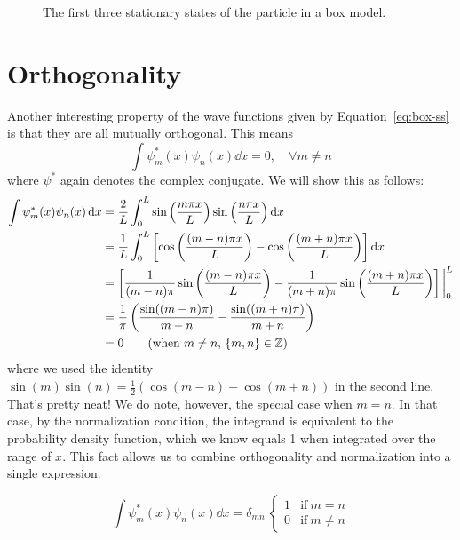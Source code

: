 \begin{figure}[!h]
	\centering
	\subfloat[]{\texttt{[image: ss-1]}}
	\subfloat[]{\texttt{[image: ss-2]}}
	\subfloat[]{\texttt{[image: ss-3]}}
	\caption{The first three stationary states of the particle in a box model.}
	\label{fig:ss-box}
\end{figure}


\section{Orthogonality}
Another interesting property of the wave functions given by Equation~\ref{eq:box-ss} is that they are all mutually orthogonal. This means 
\begin{equation*}
	\int \psi_m^*(x) \psi_n(x) \dd{x} = 0, \quad \forall m \neq n
\end{equation*}
where $\psi^*$ again denotes the complex conjugate. We will show this as follows:
\begin{align*}
	\int \psi_m^*(x) \psi_n(x) \dd{x} &= \frac{2}{L} \int_0^L \sin\left(\frac{m\pi x}{L}\right) \sin\left(\frac{n\pi x}{L} \right) \dd{x} \\
	&= \frac{1}{L} \int_{0}^{L} \left[ \cos\left(\frac{(m-n)\pi x}{L}\right) - \cos\left(\frac{(m+n)\pi x}{L}\right) \right] \dd{x} \\
	&= \left[ \frac{1}{(m-n)\pi} \sin \left(\frac{(m-n)\pi x}{L}\right) - \frac{1}{(m+n)\pi} \sin\left( \frac{(m+n)\pi x}{L} \right)\right] \bigg|_0^L \\
	&= \frac{1}{\pi} \left( \frac{\sin((m-n)\pi)}{m-n} - \frac{\sin((m+n)\pi)}{m+n}\right) \\
	&= 0 \tag{when $m\neq n$, $\{m,n\} \in \mathbb{Z}$}
\end{align*}
where we used the identity $\sin(m)\sin(n) = \frac{1}{2}(\cos(m-n) - \cos(m+n))$ in the second line. That's pretty neat! We do note, however, the special case when $m=n$. In that case, by the normalization condition, the integrand is equivalent to the probability density function, which we know equals 1 when integrated over the range of $x$. This fact allows us to combine orthogonality and normalization into a single expression.
\begin{tcolorbox}[title = Orthonormal stationary states] \vspace{-2ex}
	\begin{equation}
		\int \psi_m^*(x) \psi_n(x) \dd{x} = \delta_{mn}\ \begin{cases}
		1 & \text{if}\ m=n \\
		0 & \text{if}\ m\neq n
		\end{cases} \label{eq:orthonorm}
	\end{equation}
\end{tcolorbox}

